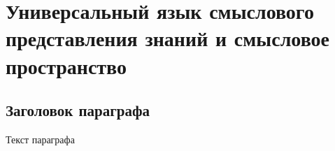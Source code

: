 \chapter{Универсальный язык смыслового представления знаний и смысловое пространство}
\label{chapter_sc_code}


\section{Заголовок параграфа}
Текст параграфа

%